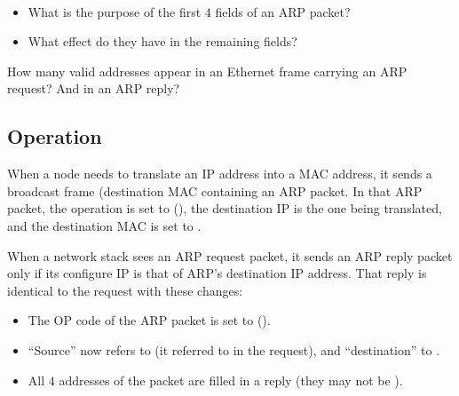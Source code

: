 \begin{exercise}\ \\[-0.5cm]
\begin{itemize}
\item What is the purpose of the first $4$ fields of an ARP packet?
\item What effect do they have in the remaining fields?
\end{itemize}
\end{exercise}

\begin{exercise}
How many valid addresses appear in an Ethernet frame carrying an ARP request?
And in an ARP reply?
\end{exercise}


\subsection{Operation}\label{sec:layer3:arp:operation}

When a node  needs to translate an IP address into a MAC address, it sends a broadcast frame
(destination MAC  containing an ARP packet. 
In that ARP packet, the operation is set to  (),
the destination IP is the one being translated, and
the destination MAC is set to .

When a network stack  sees an ARP request packet, 
it sends an ARP reply packet only if 
its configure IP is that of ARP's destination IP address.
That reply is identical to the request with these changes:
\begin{itemize}
\item The OP code of the ARP packet is set to  ().
\item ``Source'' now refers to  (it referred to  in the request),
  and ``destination'' to .
\item All $4$ addresses of the packet are filled in a reply 
  (they may not be ).
\end{itemize}

